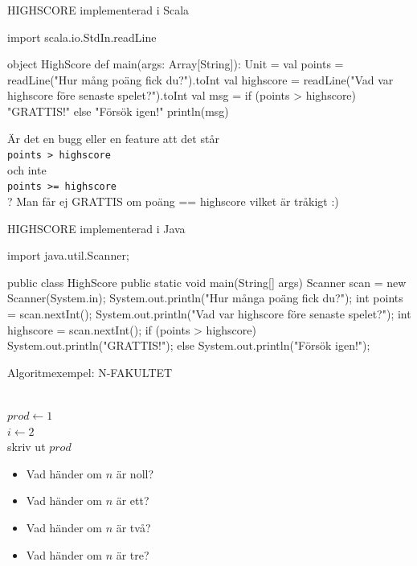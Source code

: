 \ifkompendium\else
\begin{SlideExtra}{HIGHSCORE implementerad i Scala}
\begin{Code}
import scala.io.StdIn.readLine

object HighScore {
  def main(args: Array[String]): Unit = {
    val points = readLine("Hur mång poäng fick du?").toInt
    val highscore = readLine("Vad var highscore före senaste spelet?").toInt
    val msg = if (points > highscore) "GRATTIS!" else "Försök igen!"
    println(msg)
  }
}
\end{Code}
\SlideFontSmall %
\pause
Är det en bugg eller en feature att det står\\ \texttt{points > highscore} \\ och inte \\ \texttt{points >= highscore} \\ ?
\pause Man får ej GRATTIS om poäng == highscore vilket är tråkigt :)
\end{SlideExtra}


\begin{SlideExtra}{HIGHSCORE implementerad i Java}
\begin{Code}[language=Java]
import java.util.Scanner;

public class HighScore {
    public static void main(String[] args){
        Scanner scan = new Scanner(System.in);
        System.out.println("Hur många poäng fick du?");
        int points =  scan.nextInt();
        System.out.println("Vad var highscore före senaste spelet?");
        int highscore = scan.nextInt();
        if (points > highscore) {
            System.out.println("GRATTIS!");
        } else {
            System.out.println("Försök igen!");
        }
    }
}
\end{Code}
\end{SlideExtra}
\fi

\begin{Slide}{Algoritmexempel: N-FAKULTET}
\begin{algorithm}[H]

 ~\\
 $prod \leftarrow 1$ \\
 $i \leftarrow 2$  \\
 skriv ut $prod$
\end{algorithm}
\pause\vspace{1em}
\begin{itemize}\SlideFontSmall
\item Vad händer om $n$ är noll?
\item Vad händer om $n$ är ett?
\item Vad händer om $n$ är två?
\item Vad händer om $n$ är tre?
\end{itemize}
\end{Slide}

